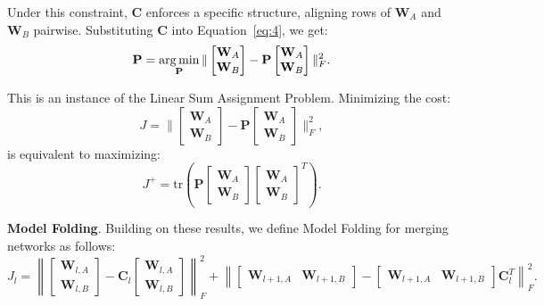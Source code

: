 \documentclass{article}
\newcommand\fakeparagraph[1]{\par\noindent\textbf{{#1}}.\xspace}
\begin{document}
{Under this constraint, $\mathbf{C}$ enforces a specific structure, aligning rows of $\mathbf{W}_A$ and $\mathbf{W}_B$ pairwise. Substituting $\mathbf{C}$ into Equation~\ref{eq:4}, we get:
\begin{equation*}
    \mathbf{P} = \operatorname*{arg\,min}_{\mathbf{P}} \|\begin{bmatrix} \mathbf{W}_A \\ \mathbf{W}_B \end{bmatrix} - \mathbf{P} \begin{bmatrix} \mathbf{W}_A \\ \mathbf{W}_B \end{bmatrix}\|_F^2.
\end{equation*}

\noindent This is an instance of the Linear Sum Assignment Problem. Minimizing the cost:
\begin{equation*}
    J = \|\begin{bmatrix} \mathbf{W}_A \\ \mathbf{W}_B \end{bmatrix} - \mathbf{P} \begin{bmatrix} \mathbf{W}_A \\ \mathbf{W}_B \end{bmatrix}\|_F^2,
\end{equation*}
is equivalent to maximizing:
\begin{equation*}
    J^+ = \text{tr}\left(\mathbf{P}\begin{bmatrix}\mathbf{W}_A \\ \mathbf{W}_B\end{bmatrix}\begin{bmatrix}\mathbf{W}_A \\ \mathbf{W}_B\end{bmatrix}^T\right).
\end{equation*}

\fakeparagraph{Model Folding} Building on these results, we define Model Folding for merging networks as follows:
\begin{equation*}
    J_l = \left\|\begin{bmatrix}
    \mathbf{W}_{l,A} \\
    \mathbf{W}_{l,B}
    \end{bmatrix} - \mathbf{C}_l \begin{bmatrix}
    \mathbf{W}_{l,A} \\
    \mathbf{W}_{l,B}
    \end{bmatrix}\right\|_F^2 + \left\|\begin{bmatrix}
    \mathbf{W}_{l+1,A} &
    \mathbf{W}_{l+1,B}
    \end{bmatrix} - \begin{bmatrix}
    \mathbf{W}_{l+1,A} &
    \mathbf{W}_{l+1,B}
    \end{bmatrix}\mathbf{C}_{l}^T\right\|_F^2.
\end{equation*}

}
\end{document}
